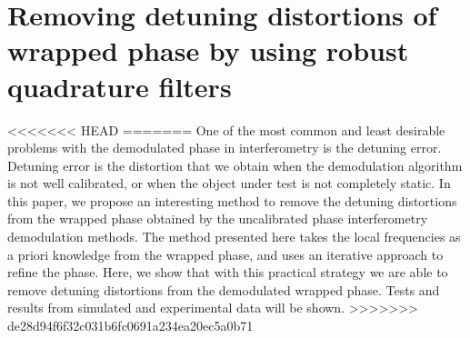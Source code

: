 \chapter{Removing detuning distortions of wrapped phase by using robust 
 quadrature filters}

<<<<<<< HEAD
=======
One of the most common and least desirable problems with the 
demodulated phase in interferometry is the detuning error. Detuning error is 
the distortion that we obtain when the demodulation algorithm is not well 
calibrated, or when the object under test is not completely static. In this 
paper, we propose an interesting method to remove the detuning distortions from 
the wrapped phase obtained by the uncalibrated phase interferometry 
demodulation methods. The method presented here takes the local frequencies as 
a priori knowledge from the wrapped phase, and uses an iterative approach to 
refine the phase. Here, we show that with this practical strategy we are able 
to remove detuning distortions from the demodulated wrapped phase. Tests and
results from simulated and experimental data will be shown.
>>>>>>> de28d94f6f32c031b6fc0691a234ea20ec5a0b71

 

